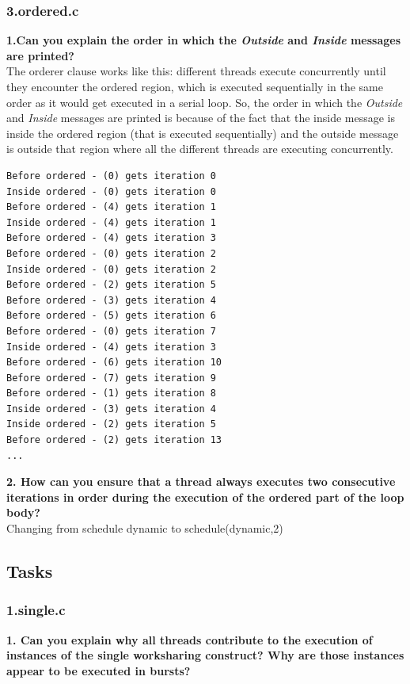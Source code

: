 \documentclass[12]{article}
\begin{document}
\subsubsection{3.ordered.c}
\textbf{1.Can you explain the order in which the \textit{Outside} and \textit{Inside} messages are printed?} 
\\
The orderer clause works like this: different threads execute concurrently until they encounter the ordered region, which is executed sequentially in the same order as it would get executed in a serial loop. So, the order in which the \textit{Outside} and \textit{Inside} messages are printed is because of the fact that the inside message is inside the ordered region (that is executed sequentially) and the outside message is outside that region where all the different threads are executing concurrently. 
\\
\begin{lstlisting}[frame=single]
Before ordered - (0) gets iteration 0
Inside ordered - (0) gets iteration 0
Before ordered - (4) gets iteration 1
Inside ordered - (4) gets iteration 1
Before ordered - (4) gets iteration 3
Before ordered - (0) gets iteration 2
Inside ordered - (0) gets iteration 2
Before ordered - (2) gets iteration 5
Before ordered - (3) gets iteration 4
Before ordered - (5) gets iteration 6
Before ordered - (0) gets iteration 7
Inside ordered - (4) gets iteration 3
Before ordered - (6) gets iteration 10
Before ordered - (7) gets iteration 9
Before ordered - (1) gets iteration 8
Inside ordered - (3) gets iteration 4
Inside ordered - (2) gets iteration 5
Before ordered - (2) gets iteration 13
...
\end{lstlisting}

\textbf{2. How can you ensure that a thread always executes two consecutive iterations in order during the execution of the ordered part of the loop body?}
\\
Changing from schedule dynamic to schedule(dynamic,2)

\subsection{Tasks}
\subsubsection{1.single.c}
\textbf{1. Can you explain why all threads contribute to the execution of instances of the single worksharing
construct? Why are those instances appear to be executed in bursts?}
\end{document}
